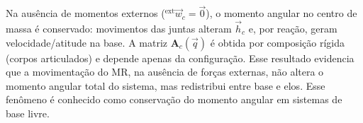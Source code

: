 Na ausência de momentos externos
(${}^{\text{ext}}\vec w_{c}=\vec 0$),
o momento angular no centro de massa é conservado: movimentos das juntas alteram $\vec h_{c}$ e, por reação, geram velocidade/atitude na base.
A matriz $\mathbf A_{c}(\vec q)$ é obtida por composição rígida (corpos articulados) e depende apenas da configuração.
Esse resultado evidencia que a movimentação do MR, na ausência de forças externas, não altera o momento angular total do sistema, mas redistribui entre base e elos. 
Esse fenômeno é conhecido como conservação do momento angular em sistemas de base livre.
